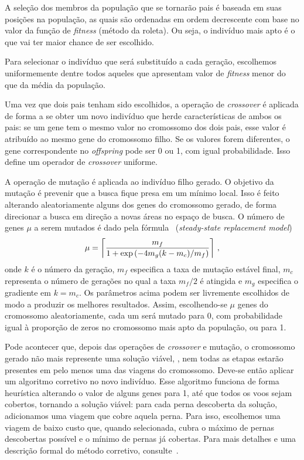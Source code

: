 A seleção dos membros da população que se tornarão pais é baseada em suas posições na população, as
quais são ordenadas em ordem decrescente com base no valor da função de {\it fitness} (método da
roleta). Ou seja, o indivíduo mais apto é o que vai ter maior chance de ser escolhido.

Para selecionar o indivíduo que será substituído a cada geração, escolhemos uniformemente dentre
todos aqueles que apresentam valor de {\it fitness} menor do que da média da população.

Uma vez que dois pais tenham sido escolhidos, a operação de {\it crossover} é aplicada de forma a
se obter um novo indivíduo que herde características de ambos os pais: se um gene tem o mesmo valor
no cromossomo dos dois pais, esse valor é atribuído ao mesmo gene do cromossomo filho. Se os valores
forem diferentes, o gene correspondente no {\it offspring} pode ser 0 ou 1, com igual probabilidade.
Isso define um operador de {\it crossover} uniforme.

A operação de mutação é aplicada ao indivíduo filho gerado. O objetivo da mutação é prevenir que a
busca fique presa em um mínimo local. Isso é feito alterando aleatoriamente alguns dos genes do
cromossomo gerado, de forma direcionar a busca em direção a novas áreas no espaço de busca. O número
de genes $\mu$ a serem mutados é dado pela fórmula~\cite{beasley96} ({\it steady-state replacement
model})
%
\begin{equation*}
\mu	= \left\lceil \frac{m_f}{1+\exp{\left(-4m_g(k - m_c)/m_f\right)}} \right\rceil \, ,
\end{equation*}
%
onde $k$ é o número da geração, $m_f$ especifica a taxa de mutação estável final, $m_c$ representa o
número de gerações no qual a taxa $m_f/2$ é atingida e $m_g$ especifica o gradiente em $k = m_c$. Os
parâmetros acima podem ser livremente escolhidos de modo a produzir os melhores resultados. Assim,
escolhendo-se $\mu$ genes do cromossomo aleatoriamente, cada um será mutado para 0, com
probabilidade igual à proporção de zeros no cromossomo mais apto da população, ou para 1.

Pode acontecer que, depois das operações de {\it crossover} e mutação, o cromossomo gerado não mais
represente uma solução viável, \ie, nem todas as etapas estarão presentes em pelo menos uma das
viagens do cromossomo. Deve-se então aplicar um algoritmo corretivo no novo indivíduo. Esse
algoritmo funciona de forma heurística alterando o valor de alguns genes para 1, até que todos os
voos sejam cobertos, tornando a solução viável: para cada perna descoberta da solução, adicionamos
uma viagem que cobre aquela perna. Para isso, escolhemos uma viagem de baixo custo que, quando
selecionada, cubra o máximo de pernas descobertas possível e o mínimo de pernas já cobertas. Para
mais detalhes e uma descrição formal do método corretivo, consulte~\cite{beasley96}.

